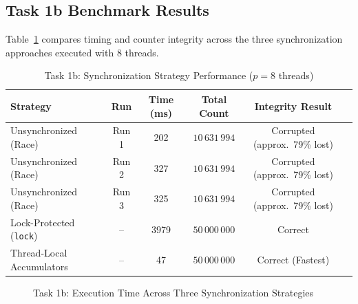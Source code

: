 \documentclass[12pt,a4paper]{article}
\begin{document}
\subsection{Task 1b Benchmark Results}
Table~\ref{tab:results_task1b} compares timing and counter integrity across the three synchronization approaches executed with 8 threads.

\begin{table}[htbp]
\centering
\caption{Task 1b: Synchronization Strategy Performance ($p = 8$ threads)}
\label{tab:results_task1b}
\small
\begin{tabularx}{\textwidth}{lccccX}
\toprule
\textbf{Strategy} & \textbf{Run} & \textbf{Time (ms)} & \textbf{Total Count} & \textbf{Integrity Result} \\
\midrule
Unsynchronized (Race) & Run 1 & 202 & $10\,631\,994$ & Corrupted (approx.\ 79\% lost) \\
Unsynchronized (Race) & Run 2 & 327 & $10\,631\,994$ & Corrupted (approx.\ 79\% lost) \\
Unsynchronized (Race) & Run 3 & 325 & $10\,631\,994$ & Corrupted (approx.\ 79\% lost) \\
Lock-Protected (\texttt{lock}) & -- & 3979 & $50\,000\,000$ & Correct \\
Thread-Local Accumulators & -- & 47 & $50\,000\,000$ & Correct (Fastest) \\
\bottomrule
\end{tabularx}
\end{table}

\begin{figure}[htbp]
\centering
{}
\caption{Task 1b: Execution Time Across Three Synchronization Strategies}
\label{fig:task1b_comparison}
\end{figure}
\end{document}
